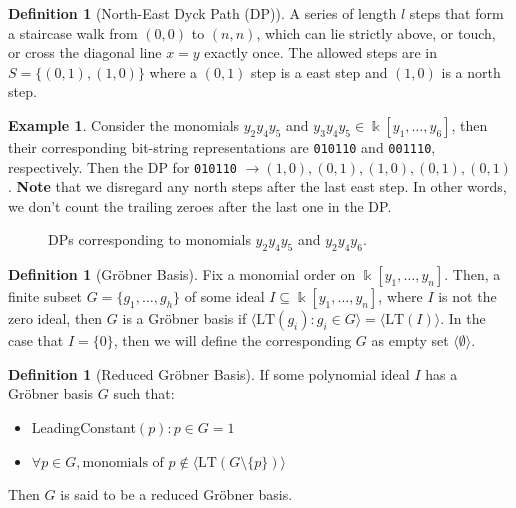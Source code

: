 \documentclass[12pt,reqno]{amsart}
\theoremstyle{plain}
\theoremstyle{definition}
\newtheorem{example}[theorem]{Example}
\newtheorem{definition}[theorem]{Definition}
\def\field{\Bbbk}
\begin{document}
\begin{definition}[North-East Dyck Path (DP)]
	A series of length $l$ steps that form a staircase walk from $(0,0)$ to $(n,n)$, which can lie strictly above,
	or touch, or cross the diagonal line $x=y$ exactly once. The allowed steps are in $S = \{(0,1), (1,0)\}$ where
	a $(0,1)$ step is a east step and $(1,0)$ is a north step.
	\begin{example}
		Consider the monomials $y_2y_4y_5$ and $y_3y_4y_5 \in \field[y_1, \dots, y_6]$, then their corresponding bit-string representations are \texttt{010110} and \texttt{001110}, respectively. Then the DP for
		\texttt{010110} $\rightarrow (1,0), (0,1), (1,0), (0,1),(0,1)$. \textbf{Note} that we disregard any north steps after the last east step. In other words, we don't count the trailing zeroes after the last one in
		the DP.  
		\begin{figure}[h!]
			\centering
			\caption{DPs corresponding to monomials $y_2y_4y_5$ and $y_2y_4y_6$.}
		\end{figure}
	\end{example}
\end{definition}

\begin{definition}[Gr\"obner Basis]
	Fix a monomial order on $\field[y_1, \dots, y_n]$. Then, a finite subset $G = \{g_1, \dots, g_h\}$ of 
	some ideal $I \subseteq \field[y_1, \dots, y_n]$, where $I$ is not the zero ideal, then $G$ is a 
	Gr\"obner basis if $\langle \text{LT}(g_i): g_i \in G \rangle = \langle \text{LT}(I) \rangle$. 
	In the case that $I = \{ 0\}$, then we will define the corresponding $G$ as empty set $\langle \emptyset \rangle$.
\end{definition}
\begin{definition}[Reduced Gr\"obner Basis]
	If some polynomial ideal $I$ has a Gr\"obner basis $G$ such that:
	\begin{itemize}
		\item LeadingConstant$(p) : p \in G = 1$
		\item $\forall p \in G, \text{monomials of }p \notin \langle \text{LT}(G \setminus   \{ p\}) \rangle$ 
	\end{itemize}
	Then $G$ is said to be a reduced Gr\"obner basis.
\end{definition}
\end{document}
